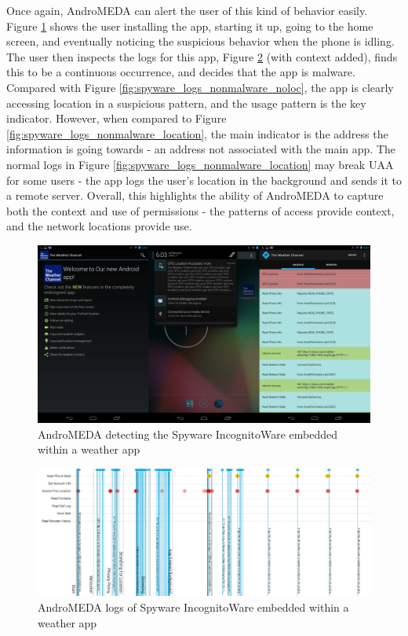 Once again, AndroMEDA can alert the user of this kind of behavior easily. Figure \ref{fig:spyware_visual} shows the user installing the app, starting it up, going to the home screen, and eventually noticing the suspicious behavior when the phone is idling. The user then inspects the logs for this app, Figure \ref{fig:spyware_logs_malware} (with context added), finds this to be a continuous occurrence, and decides that the app is malware. Compared with Figure \ref{fig:spyware_logs_nonmalware_noloc}, the app is clearly accessing location in a suspicious pattern, and the usage pattern is the key indicator. However, when compared to Figure \ref{fig:spyware_logs_nonmalware_location}, the main indicator is the address the information is going towards - an address not associated with the main app. The normal logs in Figure \ref{fig:spyware_logs_nonmalware_location} may break UAA for some users - the app logs the user's location in the background and sends it to a remote server. Overall, this highlights the ability of AndroMEDA to capture both the context and use of permissions - the patterns of access provide context, and the network locations provide use.




\begin{figure}[h]
\begin{center}
\includegraphics[width=1.0\columnwidth]{figs/weather_detection}
\caption{AndroMEDA detecting the Spyware IncognitoWare embedded within a weather app }
\label{fig:spyware_visual}
\end{center}
\end{figure}


\begin{figure}[h]
\begin{center}
\includegraphics[width=1.0\columnwidth]{figs/AndroMEDA_Weather_Malware}
\caption{AndroMEDA logs of Spyware IncognitoWare embedded within a weather app }
\label{fig:spyware_logs_malware}
\end{center}
\end{figure}

